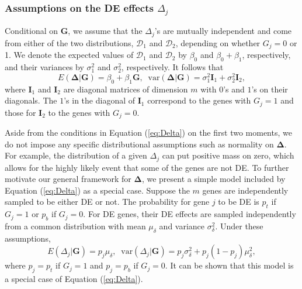 \documentclass[a4,center,fleqn]{NAR}
\begin{document}
	\subsubsection{Assumptions on the DE effects $\Delta_j$}\label{subsection:DeltaModel}
	Conditional on $\bm G$, we assume that the $\Delta_j$'s are mutually independent and come from
	either of the two distributions, $\mathscr{D}_1$ and $\mathscr{D}_2$, depending on whether $G_j=0$
	or 1. We denote the expected values of $\mathscr{D}_1$ and $\mathscr{D}_2$ by $\beta_0$ and
	$\beta_0+\beta_1$, respectively, and their variances by $\sigma_1^2$ and $\sigma_2^2$, respectively.
	It follows that 
	\begin{equation}
	\label{eq:Delta}
	E(\bm \Delta|\bm G)=\beta_0 + \beta_1 \bm G,\;\; \mbox{var}(\bm \Delta|\bm G) = \sigma_1^2\bm
	I_1+\sigma_2^2\bm I_2,
	\end{equation} 
	where $\bm I_1$ and $\bm I_2$ are diagonal matrices of dimension $m$ with $0$'s and $1$'s on their
	diagonals. The $1$'s in the diagonal of $\bm I_1$ correspond to the genes with $G_j=1$ and those for
	$\bm I_2$ to the genes with $G_j=0$.
	
	Aside from the conditions in Equation (\ref{eq:Delta}) on the first two moments, we do not impose
	any specific distributional assumptions such as normality on $\bm \Delta$. For example, the
	distribution of a given $\Delta_j$ can put positive mass on zero, which allows for the highly likely
	event that some of the genes are not DE. To further motivate our general framework for $\bm \Delta$,
	we present a simple model included by Equation (\ref{eq:Delta}) as a special case. Suppose the $m$
	genes are independently sampled to be either DE or not. The probability for gene $j$ to be DE is
	$p_t$ if $G_j=1$ or $p_b$ if $G_j=0$. For DE genes, their DE effects are sampled independently from
	a common distribution with mean $\mu_\delta$ and variance $\sigma^2_\delta$. Under these
	assumptions, 
	\begin{equation}
	\label{eq:DeltaBinom}
	E(\Delta_j|\bm G) = p_j\mu_{\delta},\;\; \mbox{var}(\Delta_j|\bm G)= p_j\sigma_{\delta}^2 +
	p_j(1-p_j)\mu_{\delta}^2,
	\end{equation}
	where $p_j=p_{t}$ if $G_j=1$ and $p_j=p_{b}$ if $G_j=0$. It can be shown that this model is a
	special case of Equation (\ref{eq:Delta}).
	
\end{document}
